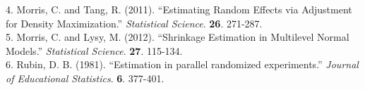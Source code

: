 \documentclass[article]{jss}
\begin{document}
4. Morris, C. and Tang, R. (2011). ``Estimating Random Effects via Adjustment for Density Maximization.'' \emph{Statistical Science}. \textbf{26}. 271-287.
\\

5. Morris, C. and Lysy, M. (2012). ``Shrinkage Estimation in Multilevel Normal Models.'' \emph{Statistical Science}. \textbf{27}. 115-134.
\\

6. Rubin, D. B. (1981). ``Estimation in parallel randomized
  experiments.'' \emph{Journal of Educational Statistics}. \textbf{6}. 377-401.
\\
\end{document}
